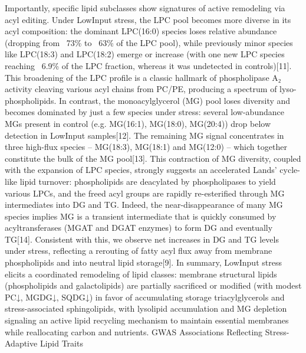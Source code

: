 \documentclass[10pt,letterpaper]{article}
\begin{document}
Importantly, specific lipid subclasses show signatures of active remodeling via acyl editing. Under LowInput stress, the LPC pool becomes more diverse in its acyl composition: the dominant LPC(16:0) species loses relative abundance (dropping from ~73\% to ~63\% of the LPC pool), while previously minor species like LPC(18:3) and LPC(18:2) emerge or increase (with one new LPC species reaching ~6.9\% of the LPC fraction, whereas it was undetected in controls)[11]. This broadening of the LPC profile is a classic hallmark of phospholipase A₂ activity cleaving various acyl chains from PC/PE, producing a spectrum of lyso-phospholipids. In contrast, the monoacylglycerol (MG) pool loses diversity and becomes dominated by just a few species under stress: several low-abundance MGs present in control (e.g. MG(16:1), MG(18:0), MG(20:4)) drop below detection in LowInput samples[12]. The remaining MG signal concentrates in three high-flux species – MG(18:3), MG(18:1) and MG(12:0) – which together constitute the bulk of the MG pool[13]. This contraction of MG diversity, coupled with the expansion of LPC species, strongly suggests an accelerated Lands’ cycle-like lipid turnover: phospholipids are deacylated by phospholipases to yield various LPCs, and the freed acyl groups are rapidly re-esterified through MG intermediates into DG and TG. Indeed, the near-disappearance of many MG species implies MG is a transient intermediate that is quickly consumed by acyltransferases (MGAT and DGAT enzymes) to form DG and eventually TG[14]. Consistent with this, we observe net increases in DG and TG levels under stress, reflecting a rerouting of fatty acyl flux away from membrane phospholipids and into neutral lipid storage[9]. In summary, LowInput stress elicits a coordinated remodeling of lipid classes: membrane structural lipids (phospholipids and galactolipids) are partially sacrificed or modified (with modest PC↓, MGDG↓, SQDG↓) in favor of accumulating storage triacylglycerols and stress-associated sphingolipids, with lysolipid accumulation and MG depletion signaling an active lipid recycling mechanism to maintain essential membranes while reallocating carbon and nutrients.
GWAS Associations Reflecting Stress-Adaptive Lipid Traits
\end{document}

